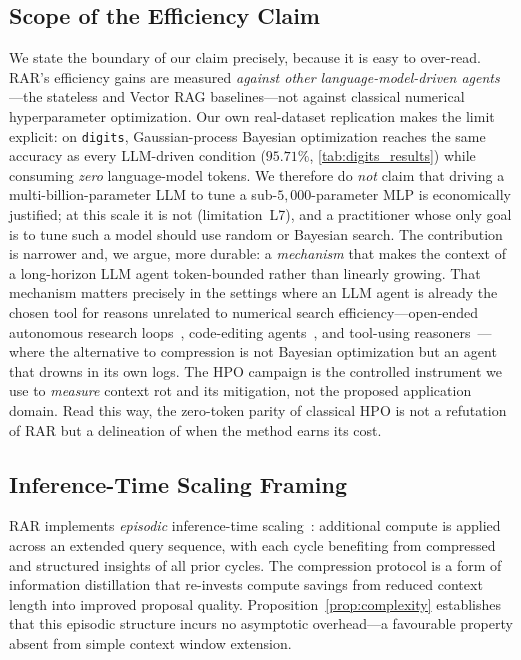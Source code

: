 \documentclass[conference]{IEEEtran}
\begin{document}
\subsection{Scope of the Efficiency Claim}
\label{sec:scope}
We state the boundary of our claim precisely, because it is easy to over-read. RAR's efficiency gains are measured \emph{against other language-model-driven agents}---the stateless and Vector RAG baselines---not against classical numerical hyperparameter optimization. Our own real-dataset replication makes the limit explicit: on \texttt{digits}, Gaussian-process Bayesian optimization reaches the same accuracy as every LLM-driven condition ($95.71\%$, \cref{tab:digits_results}) while consuming \emph{zero} language-model tokens. We therefore do \emph{not} claim that driving a multi-billion-parameter LLM to tune a sub-$5{,}000$-parameter MLP is economically justified; at this scale it is not (limitation~L7), and a practitioner whose only goal is to tune such a model should use random or Bayesian search. The contribution is narrower and, we argue, more durable: a \emph{mechanism} that makes the context of a long-horizon LLM agent token-bounded rather than linearly growing. That mechanism matters precisely in the settings where an LLM agent is already the chosen tool for reasons unrelated to numerical search efficiency---open-ended autonomous research loops~\citep{karpathy2026,lu2024aiscientist}, code-editing agents~\citep{yang2024sweagent,jimenez2023swebench}, and tool-using reasoners~\citep{yao2022react,wang2023voyager}---where the alternative to compression is not Bayesian optimization but an agent that drowns in its own logs. The HPO campaign is the controlled instrument we use to \emph{measure} context rot and its mitigation, not the proposed application domain. Read this way, the zero-token parity of classical HPO is not a refutation of RAR but a delineation of when the method earns its cost.

\subsection{Inference-Time Scaling Framing}
RAR implements \emph{episodic} inference-time scaling~\citep{snell2024scaling}: additional compute is applied across an extended query sequence, with each cycle benefiting from compressed and structured insights of all prior cycles. The compression protocol is a form of information distillation that re-invests compute savings from reduced context length into improved proposal quality. Proposition~\ref{prop:complexity} establishes that this episodic structure incurs no asymptotic overhead---a favourable property absent from simple context window extension.
\end{document}

